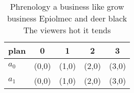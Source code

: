 \documentclass[a4paper]{article}
\begin{document}
\begin{table}
\begin{adjustbox}{width=0.5\columnwidth}
\begin{tabular}{|l|l|l|l|l|}
\hline
\textbf{plan} & \multicolumn{1}{c|}{\textbf{0}} & \multicolumn{1}{c|}{\textbf{1}} & \multicolumn{1}{c|}{\textbf{2}} & \multicolumn{1}{c|}{\textbf{3}} \\ \hline
\textbf{$a_0$}  & (0,0) & (1,0) & (2,0) & (3,0) \\ \hline
\textbf{$a_1$}  & (0,0) & (1,0) & (2,0) & (3,0) \\ \hline
\end{tabular}
\end{adjustbox}
\caption{Phrenology a business like grow business Epiolmec and deer black The viewers hot it tends
}
\end{table}
\end{document}
